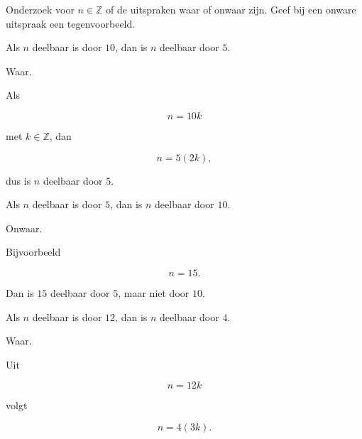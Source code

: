 \documentclass{ximera}
\begin{document}
\begin{oefening}[Deelbaarheid]{\oefB\ESS}

Onderzoek voor $n\in\mathbb{Z}$ of de uitspraken waar of onwaar zijn.
Geef bij een onware uitspraak een tegenvoorbeeld.

\begin{question}

Als $n$ deelbaar is door $10$, dan is $n$ deelbaar door $5$.

\begin{oplossing}

Waar.

Als

\[
n=10k
\]

met $k\in\mathbb{Z}$, dan

\[
n=5(2k),
\]

dus is $n$ deelbaar door $5$.

\end{oplossing}

\end{question}


\begin{question}

Als $n$ deelbaar is door $5$, dan is $n$ deelbaar door $10$.

\begin{oplossing}

Onwaar.

Bijvoorbeeld

\[
n=15.
\]

Dan is $15$ deelbaar door $5$, maar niet door $10$.

\end{oplossing}

\end{question}


\begin{question}

Als $n$ deelbaar is door $12$, dan is $n$ deelbaar door $4$.

\begin{oplossing}

Waar.

Uit

\[
n=12k
\]

volgt

\[
n=4(3k).
\]

\end{oplossing}

\end{question}


\begin{question}


\end{question}
\end{oefening}
\end{document}
